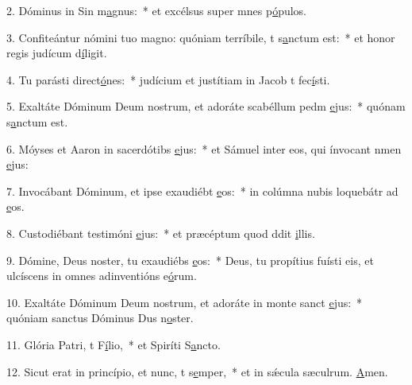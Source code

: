 2. Dóminus in Sin m\uline{a}gnus:~* et excélsus super mnes p\uline{ó}pulos.\par 
3. Confiteántur nómini tuo magno: quóniam terríbile, t s\uline{a}nctum est:~* et honor regis judícum d\uline{í}ligit.\par 
4. Tu parásti direct\uline{ó}nes:~* judícium et justítiam in Jacob t fec\uline{í}sti.\par 
5. Exaltáte Dóminum Deum nostrum, et adoráte scabéllum pedm \uline{e}jus:~* quónam s\uline{a}nctum est.\par 
6. Móyses et Aaron in sacerdótibs \uline{e}jus:~* et Sámuel inter eos, qui ínvocant nmen \uline{e}jus:\par 
7. Invocábant Dóminum, et ipse exaudiébt \uline{e}os:~* in colúmna nubis loquebátr ad \uline{e}os.\par 
8. Custodiébant testimóni \uline{e}jus:~* et præcéptum quod ddit \uline{i}llis.\par 
9. Dómine, Deus noster, tu exaudiébs \uline{e}os:~* Deus, tu propítius fuísti eis, et ulcíscens in omnes adinventións e\uline{ó}rum.\par 
10. Exaltáte Dóminum Deum nostrum, et adoráte in monte sanct \uline{e}jus:~* quóniam sanctus Dóminus Dus n\uline{o}ster.\par 
11. Glória Patri, t F\uline{í}lio,~* et Spiríti S\uline{a}ncto.\par 
12. Sicut erat in princípio, et nunc, t s\uline{e}mper,~* et in sǽcula sæculrum. \uline{A}men.\par 
